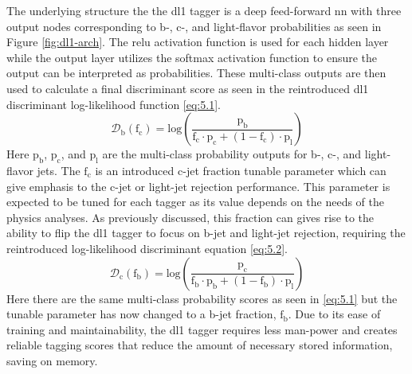 The underlying structure the the \gls{dl1} tagger is a deep feed-forward \gls{nn} with three output nodes corresponding to b-, c-, and light-flavor probabilities as seen in Figure \ref{fig:dl1-arch}.
The \gls{relu} activation function is used for each hidden layer while the output layer utilizes the softmax activation 
function to ensure the output can be interpreted as probabilities. These multi-class outputs are then used to calculate a final discriminant score as seen in the 
reintroduced \gls{dl1} discriminant log-likelihood function \ref{eq:5.1}.
%
\begin{equation}\label{eq:5.1}
    \mathcal{D}_{\textrm{b}}(\textrm{f}_{\textrm{c}}) = \textrm{log}\left(\frac{\textrm{p}_{\textrm{b}}}{\textrm{f}_{\textrm{c}} \cdot \textrm{p}_{\textrm{c}} + (\textrm{1}-\textrm{f}_{\textrm{c}}) \cdot \textrm{p}_{\textrm{l}} }\right)
\tag{5.1}
\end{equation}
%
Here $\textrm{p}_{\textrm{b}}$, $\textrm{p}_{\textrm{c}}$, and $\textrm{p}_{\textrm{l}}$ are the multi-class probability outputs for b-, c-, and light-flavor jets. The $\textrm{f}_{\textrm{c}}$
is an introduced c-jet fraction tunable parameter which can give emphasis to the c-jet or light-jet rejection performance. This parameter is expected to be tuned for each tagger 
as its value depends on the needs of the physics analyses. As previously discussed, this fraction can gives rise to the ability to flip the \gls{dl1} tagger to focus on b-jet and 
light-jet rejection, requiring the reintroduced log-likelihood discriminant equation \ref{eq:5.2}.  
%
\begin{equation}\label{eq:5.2}
    \mathcal{D}_{\textrm{c}}(\textrm{f}_{\textrm{b}}) = \textrm{log}\left(\frac{\textrm{p}_{\textrm{c}}}{\textrm{f}_{\textrm{b}} \cdot \textrm{p}_{\textrm{b}} + (\textrm{1}-\textrm{f}_{\textrm{b}}) \cdot \textrm{p}_{\textrm{l}} }\right)
\tag{5.2}
\end{equation}
%
Here there are the same multi-class probability scores as seen in \ref{eq:5.1} but the tunable parameter has now changed to a b-jet fraction, $\textrm{f}_{\textrm{b}}$. Due to its 
ease of training and maintainability, the \gls{dl1} tagger requires less man-power and creates reliable tagging scores that reduce the amount of necessary stored information, saving 
on memory. 
%
